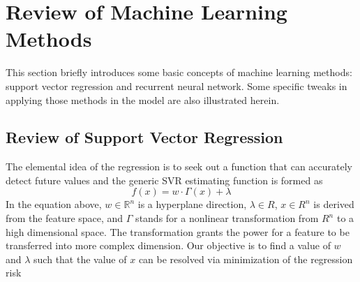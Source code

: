 \section{Review of Machine Learning Methods}
\label{sec:machine_learning_review}
This section briefly introduces some basic concepts of machine learning methods:
support vector regression and recurrent neural network. Some specific
tweaks in applying those methods in the model are also illustrated herein.

\subsection{Review of Support Vector Regression}
The elemental idea of the regression is to seek out a function that can
accurately detect future values and the generic SVR estimating function is
formed as
\begin{equation}
f\left( x \right) =  {w \cdot \Gamma \left( x \right)}  + \lambda
\label{eq:1}
\end{equation}
In the equation above, $w \in {\mathbb{R}^n}$ is a
hyperplane direction, $\lambda \in {R}$, $x \in {R^n}$ is derived from the
feature space, and $\Gamma$ stands for a nonlinear transformation from $R^n$ to
a high dimensional space. The transformation grants the power for a feature to
be transferred into more complex dimension. Our objective is to find a value of
$w$ and $\lambda$ such that the value of $x$ can be resolved via minimization
of the regression risk

